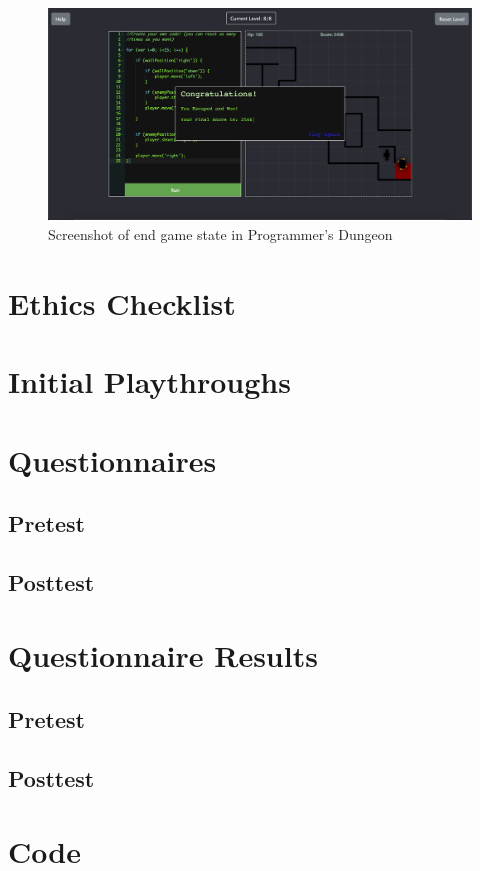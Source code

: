\documentclass[a4paper,11.5pt]{report}
\numberwithin{figure}{section}
\numberwithin{table}{section}
\numberwithin{equation}{section}
\numberwithin{equation}{section}
\begin{document}
\begin{figure}[H]
 \centering
    \includegraphics[width=1\textwidth]{endgame}
       \captionsetup{justification=centering}
\caption{Screenshot of end game state in Programmer's Dungeon}
\label{fig:endgame}
\end{figure}



\chapter{Ethics Checklist} \label{app:ethicschecklist}

\chapter{Initial Playthroughs} \label{app:initialplaythroughs}

\chapter{Questionnaires} \label{app:questionnaires}

\section{Pretest}

\section{Posttest}

\chapter{Questionnaire Results} \label{app:questionnaires}

\section{Pretest}

\section{Posttest}

\chapter{Code} \label{app:code}
\end{document}
